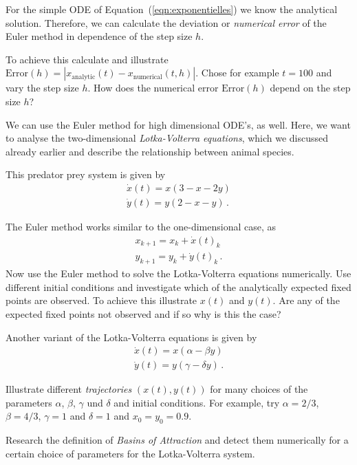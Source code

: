 \subexercise[%
  topic={Optional: Error Estimation for the Euler Method},
    ]


For the simple ODE of Equation~(\ref{eqn:exponentielles}) we know the analytical solution. Therefore, we can calculate the deviation or \emph{numerical error} of the Euler method in dependence of the step size $h$.

To achieve this calculate and illustrate $\mathrm{Error}(h)=|x_{\mathrm{analytic}}(t) - x_{\mathrm{numerical}}(t,h)|$. Chose for example $t=100$ and vary the step size $h$. How does the numerical error $\mathrm{Error}(h)$ depend on the step size $h$?

 \subexercise[%
  topic={Numerical Solution of the Lotka-Volterra Equations},
    ]

We can use the Euler method for high dimensional ODE's, as well.
Here, we want to analyse the two-dimensional \emph{Lotka-Volterra equations}, 
which we discussed already earlier and describe the relationship between animal species.


This predator prey system is given by
\begin{align}
\dot x(t) = x(3-x-2y)\\
\dot y(t) = y(2-x-y)\,.
\end{align}

The Euler method works similar to the one-dimensional case, as 
\begin{align}
x_{k+1} = x_{k} + \dot x(t)_{k} \\
y_{k+1} = y_{k} + \dot y(t)_{k}\,.
\end{align}
Now use the Euler method to solve the Lotka-Volterra equations numerically. Use different initial conditions and investigate which of the analytically expected fixed points are observed. To achieve this illustrate $x(t)$ and $y(t)$. Are any of the expected fixed points not observed and if so why is this the case?

\subexercise[%
  topic={Optional: Oscillations in the Lotka-Volterra System},
    ]
    
Another variant of the Lotka-Volterra equations is given by
\begin{align}
\dot x(t) = x(\alpha -\beta y)\\
\dot y(t) = y(\gamma -\delta y)\,.
\end{align}



Illustrate different \emph{trajectories} $(x(t),y(t))$ for many choices
of the parameters  $\alpha$, $\beta$, $\gamma$ und $\delta$ and initial
conditions. For example, try  $\alpha=2/3$, $\beta=4/3$, $\gamma=1$ and
$\delta=1$ and $x_0=y_0=0.9$.

\subexercise[%
  topic={Optional: \emph{Basins of Attraction} of the Lotka-Volterra System},
    ]

Research the definition of  \emph{Basins of Attraction} and detect them numerically for a certain choice of parameters for the Lotka-Volterra system.

